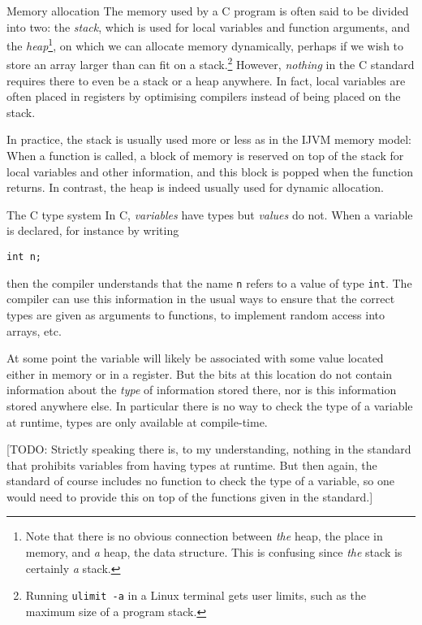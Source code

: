 \documentclass[article, a4paper, 11pt, oneside]{memoir}
\numberwithin{equation}{chapter}
\newcommand{\inlinecode}[1]{\colorbox{lightgray}{\vphantom{\texttt{jk}}\lstinline$#1$}}
\renewcommand{\inlinecode}{\lstinline}
\begin{document}
\begin{notelist}
\item[Memory allocation]
The memory used by a C program is often said to be divided into two: the \emph{stack}, which is used for local variables and function arguments, and the \emph{heap}\footnote{Note that there is no obvious connection between \emph{the} heap, the place in memory, and \emph{a} heap, the data structure. This is confusing since \emph{the} stack is certainly \emph{a} stack.}, on which we can allocate memory dynamically, perhaps if we wish to store an array larger than can fit on a stack.\footnote{Running \inlinecode{ulimit -a} in a Linux terminal gets user limits, such as the maximum size of a program stack.} However, \emph{nothing} in the C standard requires there to even be a stack or a heap anywhere. In fact, local variables are often placed in registers by optimising compilers instead of being placed on the stack.

In practice, the stack is usually used more or less as in the IJVM memory model: When a function is called, a block of memory is reserved on top of the stack for local variables and other information, and this block is popped when the function returns. In contrast, the heap is indeed usually used for dynamic allocation.

\item[The C type system]
In C, \emph{variables} have types but \emph{values} do not. When a variable is declared, for instance by writing
%
\begin{displayquote}
    \lstinline{int n;}
\end{displayquote}
%
then the compiler understands that the name \inlinecode{n} refers to a value of type \inlinecode{int}. The compiler can use this information in the usual ways to ensure that the correct types are given as arguments to functions, to implement random access into arrays, etc.

At some point the variable will likely be associated with some value located either in memory or in a register. But the bits at this location do not contain information about the \emph{type} of information stored there, nor is this information stored anywhere else. In particular there is no way to check the type of a variable at runtime, types are only available at compile-time.

[TODO: Strictly speaking there is, to my understanding, nothing in the standard that prohibits variables from having types at runtime. But then again, the standard of course includes no function to check the type of a variable, so one would need to provide this on top of the functions given in the standard.]


\end{notelist}
\end{document}
